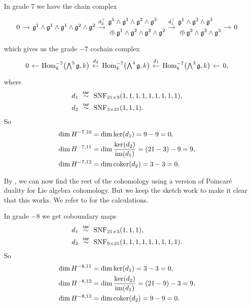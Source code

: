 In grade $7$ we have the chain complex
\[
  \begin{tikzcd}[ampersand replacement=\&, column sep=1em]
    0 \ar[r] \& \lie{g}^{1} \wedge \lie{g}^{1} \wedge \lie{g}^{1} \wedge \lie{g}^{2} \wedge \lie{g}^{2} \ar[r,"d_{2}^{\top}" {yshift=2pt}] \& \begin{aligned} &\lie{g}^{1} \wedge \lie{g}^{1} \wedge \lie{g}^{2} \wedge \lie{g}^{3} \\ &\oplus \lie{g}^{1} \wedge \lie{g}^{2} \wedge \lie{g}^{2} \wedge \lie{g}^{2} \end{aligned} \ar[r,"d_{1}^{\top}" {yshift=2pt}] \& \begin{aligned} &\lie{g}^{1} \wedge \lie{g}^{3} \wedge \lie{g}^{3} \\ &\oplus \lie{g}^{2} \wedge \lie{g}^{2} \wedge \lie{g}^{3} \end{aligned}\ar[r] \& 0
  \end{tikzcd}
\]
which gives us the grade $-7$ cochain complex
\[
  \begin{tikzcd}[column sep=1em]
    0 & \ar[l] \Hom_{k}^{-7}\bigl( \bigwedge^{5}\lie{g}, k \bigr) & \ar[l,"d_{2}"' {yshift=2pt}] \Hom_{k}^{-7}\bigl( \bigwedge^{4}\lie{g}, k \bigr) & \ar[l,"d_{1}"' {yshift=2pt}] \Hom_{k}^{-7}\bigl( \bigwedge^{3}\lie{g}, k \bigr) & \ar[l] 0,
  \end{tikzcd}
\]
where
\begin{align*}
  d_{1} &\snfsim \SNF_{21\times9}(1,1,1,1,1,1,1,1,1), \\
  d_{2} &\snfsim \SNF_{3\times21}(1,1,1).
\end{align*}
So
\begin{align*}
  \dim H^{-7,10} &= \dim \operatorname{ker}(d_{1}) = 9-9 = 0, \\
  \dim H^{-7,11} &= \dim \dfrac{\operatorname{ker}(d_{2})}{\operatorname{im}(d_{1})} = (21-3) - 9 = 9, \\
  \dim H^{-7,12} &= \dim \operatorname{coker}(d_{2}) = 3 - 3 = 0.
\end{align*}

By \cite[§3.6 and §3.7]{Fuks}, we can now find the rest of the cohomology using a version of Poincaré duality for Lie algebra cohomology. But we keep the sketch work to make it clear that this works. We refer to \cite{code} for the calculations.

In grade $-8$ we get coboundary maps
\begin{align*}
  d_{1} &\snfsim \SNF_{21\times3}(1,1,1), \\
  d_{2} &\snfsim \SNF_{9\times21}(1,1,1,1,1,1,1,1,1).
\end{align*}
So
\begin{align*}
  \dim H^{-8,11} &= \dim \operatorname{ker}(d_{1}) = 3-3 = 0, \\
  \dim H^{-8,12} &= \dim \dfrac{\operatorname{ker}(d_{2})}{\operatorname{im}(d_{1})} = (21-9) - 3 = 9, \\
  \dim H^{-8,13} &= \dim \operatorname{coker}(d_{2}) = 9 - 9 = 0.
\end{align*}


